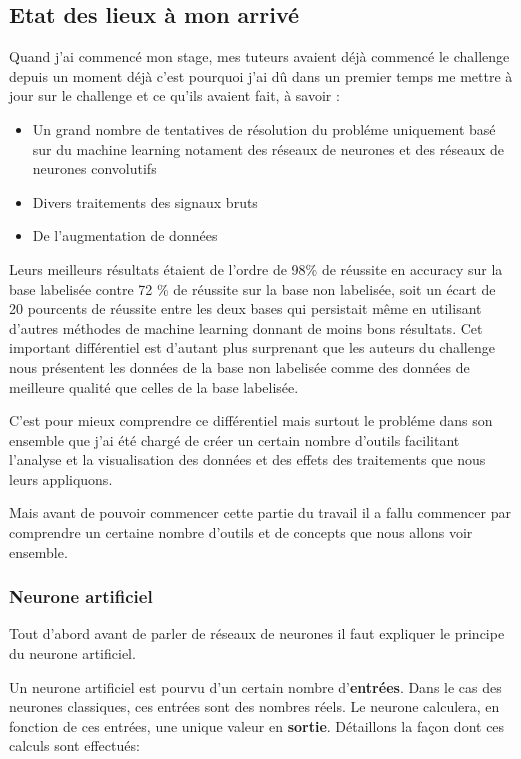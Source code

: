 \hypertarget{Etat-des-lieux-lors-de-mon-arrivuxe9}{%
\subsection{Etat des lieux à mon arrivé}
\label{Etat-des-lieux-lors-de-mon-arrivuxe9}}

Quand j'ai commencé mon stage, mes tuteurs avaient déjà commencé le challenge depuis un moment déjà c'est pourquoi j'ai dû dans un premier temps me mettre à jour sur le challenge et ce qu'ils avaient fait, à savoir :
\begin{itemize}
\item Un grand nombre de tentatives de résolution du probléme uniquement basé sur du machine learning notament des réseaux de neurones et des réseaux de neurones convolutifs
\item Divers traitements des signaux bruts
\item De l'augmentation de données
\end{itemize}



Leurs meilleurs résultats étaient de l'ordre de 98\% de réussite en accuracy sur la base labelisée contre 72 \% de réussite sur la base non labelisée, soit un écart de 20 pourcents de réussite entre les deux bases qui persistait même en utilisant d'autres méthodes de machine learning donnant de moins bons résultats.
Cet important différentiel est d'autant plus surprenant que les auteurs du challenge nous présentent les données de la base non labelisée comme des données de meilleure qualité que celles de la base labelisée.

C'est pour mieux comprendre ce différentiel mais surtout le probléme dans son ensemble que j'ai été chargé de créer un certain nombre d'outils facilitant l'analyse et la visualisation des données et des effets des traitements que nous leurs appliquons.

Mais avant de pouvoir commencer cette partie du travail il a fallu commencer par comprendre un certaine nombre d'outils et de concepts que nous allons voir ensemble.


\hypertarget{Neurone-artificiel}{%
\subsubsection{Neurone artificiel}
\label{Neurone-artificiel}}
Tout d'abord avant de parler de réseaux de neurones il faut expliquer le principe du neurone artificiel.

Un neurone artificiel est pourvu d'un certain nombre d'\textbf{entrées}. Dans le cas des neurones classiques, ces entrées sont des nombres réels. Le neurone calculera, en fonction de ces entrées, une unique valeur en \textbf{sortie}.
Détaillons la façon dont ces calculs sont effectués:

